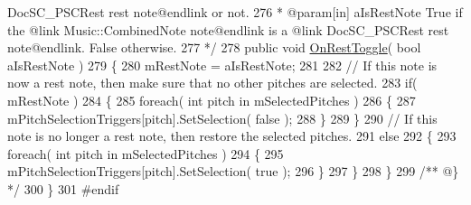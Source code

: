 \begin{DoxyCodeInclude}
{       DocSC\_PSCRest rest note@endlink or not.}
276 \textcolor{comment}{     * @param[in] aIsRestNote True if the @link Music::CombinedNote note@endlink is a @link DocSC\_PSCRest
       rest note@endlink. False otherwise.}
277 \textcolor{comment}{    */}
278     \textcolor{keyword}{public} \textcolor{keywordtype}{void} \hyperlink{group___s_c___p_s_c_handlers_ga8715b5976fdae2c56e05a60832553864}{OnRestToggle}( \textcolor{keywordtype}{bool} aIsRestNote )
279     \{
280         mRestNote = aIsRestNote;
281 
282         \textcolor{comment}{// If this note is now a rest note, then make sure that no other pitches are selected.}
283         \textcolor{keywordflow}{if}( mRestNote )
284         \{
285             \textcolor{keywordflow}{foreach}( \textcolor{keywordtype}{int} pitch \textcolor{keywordflow}{in} mSelectedPitches )
286             \{
287                 mPitchSelectionTriggers[pitch].SetSelection( \textcolor{keyword}{false} );
288             \}
289         \}
290         \textcolor{comment}{// If this note is no longer a rest note, then restore the selected pitches.}
291         \textcolor{keywordflow}{else}
292         \{
293             \textcolor{keywordflow}{foreach}( \textcolor{keywordtype}{int} pitch \textcolor{keywordflow}{in} mSelectedPitches )
294             \{
295                 mPitchSelectionTriggers[pitch].SetSelection( \textcolor{keyword}{true} );
296             \}
297         \}
298     \}\textcolor{comment}{}
299 \textcolor{comment}{    /** @\} */}
300 \}
301 \textcolor{preprocessor}{#endif}
\end{DoxyCodeInclude}
 